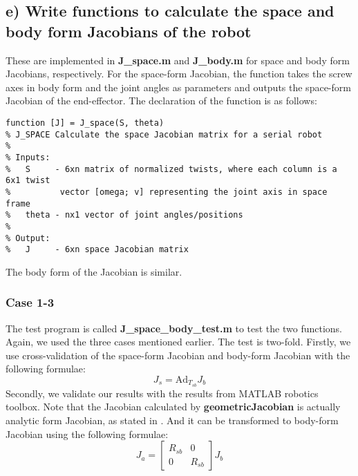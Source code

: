 \documentclass[english,10pt,a4paper]{book}
\begin{document}
    \subsection*{e) Write functions to calculate the space and body form Jacobians of the robot}
These are implemented in \textbf{J\_space.m} and \textbf{J\_body.m} for space and body form Jacobians, respectively. For the space-form Jacobian, the function takes the screw axes in body form and the joint angles as parameters and outputs the space-form Jacobian of the end-effector. The declaration of the function is as follows:
    \begin{lstlisting}[style=matlab]
function [J] = J_space(S, theta)
% J_SPACE Calculate the space Jacobian matrix for a serial robot
%
% Inputs:
%   S     - 6xn matrix of normalized twists, where each column is a 6x1 twist
%          vector [omega; v] representing the joint axis in space frame
%   theta - nx1 vector of joint angles/positions
%
% Output:
%   J     - 6xn space Jacobian matrix
\end{lstlisting}
    The body form of the Jacobian is similar.
    \subsubsection*{Case 1-3}
    The test program is called \textbf{J\_space\_body\_test.m} to test the two functions. Again, we used the three cases mentioned earlier. The test is two-fold. Firstly, we use cross-validation of the space-form Jacobian and body-form Jacobian with the following formulae:
    \[J_s = \text{Ad}_{T_{sb}} J_b\]
    Secondly, we validate our results with the results from MATLAB robotics toolbox. Note that the Jacobian calculated by \textbf{geometricJacobian} is actually analytic form Jacobian, as stated in \cite{Lynch_Park_2017}. And it can be transformed to body-form Jacobian using the following formulae:
    \[J_a = \begin{bmatrix}
        R_{sb} & 0 \\
        0 & R_{sb}
    \end{bmatrix} J_b\]
\end{document}
